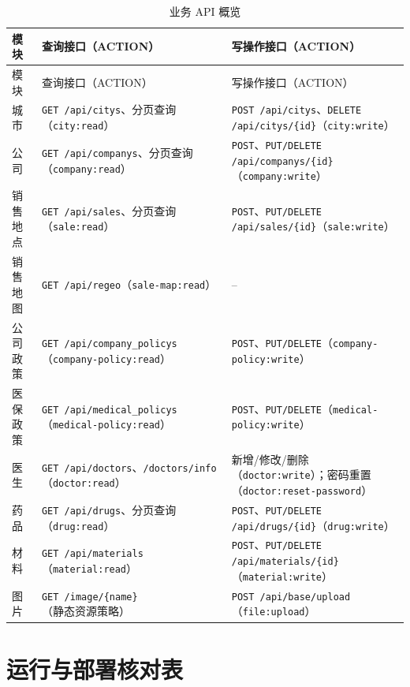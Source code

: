 \documentclass[UTF8,a4paper,12pt,openany,fontset=windows]{ctexrep}
\begin{document}
\begin{longtable}{p{2.5cm}p{5.2cm}p{5.8cm}}
  \caption{业务 API 概览}\label{tab:business-api}\\
  \toprule
  模块 & 查询接口（ACTION） & 写操作接口（ACTION） \\
  \midrule
  \endfirsthead
  \toprule
  模块 & 查询接口（ACTION） & 写操作接口（ACTION） \\
  \midrule
  \endhead
  城市 & \texttt{GET /api/citys}、分页查询（\texttt{city:read}） & \texttt{POST /api/citys}、\texttt{DELETE /api/citys/\{id\}}（\texttt{city:write}） \\
  公司 & \texttt{GET /api/companys}、分页查询（\texttt{company:read}） & \texttt{POST}、\texttt{PUT/DELETE /api/companys/\{id\}}（\texttt{company:write}） \\
  销售地点 & \texttt{GET /api/sales}、分页查询（\texttt{sale:read}） & \texttt{POST}、\texttt{PUT/DELETE /api/sales/\{id\}}（\texttt{sale:write}） \\
  销售地图 & \texttt{GET /api/regeo}（\texttt{sale-map:read}） & -- \\
  公司政策 & \texttt{GET /api/company\_policys}（\texttt{company-policy:read}） & \texttt{POST}、\texttt{PUT/DELETE}（\texttt{company-policy:write}） \\
  医保政策 & \texttt{GET /api/medical\_policys}（\texttt{medical-policy:read}） & \texttt{POST}、\texttt{PUT/DELETE}（\texttt{medical-policy:write}） \\
  医生 & \texttt{GET /api/doctors}、\texttt{/doctors/info}（\texttt{doctor:read}） & 新增/修改/删除（\texttt{doctor:write}）；密码重置（\texttt{doctor:reset-password}） \\
  药品 & \texttt{GET /api/drugs}、分页查询（\texttt{drug:read}） & \texttt{POST}、\texttt{PUT/DELETE /api/drugs/\{id\}}（\texttt{drug:write}） \\
  材料 & \texttt{GET /api/materials}（\texttt{material:read}） & \texttt{POST}、\texttt{PUT/DELETE /api/materials/\{id\}}（\texttt{material:write}） \\
  图片 & \texttt{GET /image/\{name\}}（静态资源策略） & \texttt{POST /api/base/upload}（\texttt{file:upload}） \\
  \bottomrule
\end{longtable}

\chapter{运行与部署核对表}
\end{document}
